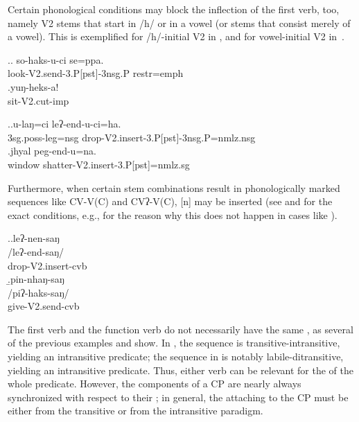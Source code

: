 Certain phonological conditions may block the inflection of the first verb, too, namely V2 stems that start in  /h/ or in a vowel (or stems that consist merely of a vowel). This is exemplified for /h/-initial V2 in \Next, and for vowel-initial V2 in~\NNext.

\ex.\ag. so-haks-u-ci se=ppa.\\
look{\sc -V2.send-3.P[pst]-3nsg.P} {\sc restr=emph}\\
 
\bg.yuŋ-heks-a!\\
sit{\sc -V2.cut-imp}\\


\ex.\ag.u-laŋ=ci leʔ-end-u-ci=ha.\\
{\sc 3sg.poss-}leg{\sc =nsg} drop{\sc -V2.insert-3.P[pst]-3nsg.P=nmlz.nsg}\\
\bg.jhyal peg-end-u=na.\\
window shatter{\sc -V2.insert-3.P[pst]=nmlz.sg}\\

\newpage
Furthermore, when  certain stem combinations result in phonologically marked sequences like CV-V(C) and CVʔ-V(C), [n] may be inserted (see  \Next and   for the exact conditions, e.g., for the reason why this does not happen in cases like \Last[a]).

\ex.\a.\glll leʔ-nen-saŋ\\
/leʔ-end-saŋ/\\
drop{\sc -V2.insert-cvb}\\
\b.\glll pin-nhaŋ-saŋ\\
/piʔ-haks-saŋ/\\
give{\sc -V2.send-cvb}\\


The first verb and the function verb do not necessarily have the same , as several of the previous examples and \Next show. In \Next[a], the sequence is transitive-intransitive, yielding an intransitive predicate; the sequence in \Next[b]  is notably labile-ditransitive, yielding an intransitive predicate. Thus, either  verb can be relevant for the  of the whole predicate. However, the components of a CP are nearly always synchronized with respect to their ; in general, the  attaching to the CP must be either from the transitive or from the intransitive paradigm. 

